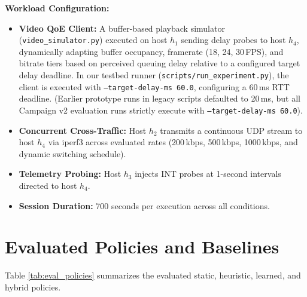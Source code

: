 \documentclass[12pt,a4paper,oneside]{report}
\begin{document}
\textbf{Workload Configuration:}
\begin{itemize}
  \item \textbf{Video QoE Client:} A buffer-based playback simulator (\texttt{video\_simulator.py}) executed on host $h_1$ sending delay probes to host $h_4$, dynamically adapting buffer occupancy, framerate (18, 24, 30\,FPS), and bitrate tiers based on perceived queuing delay relative to a configured target delay deadline. In our testbed runner (\texttt{scripts/run\_experiment.py}), the client is executed with \texttt{--target-delay-ms 60.0}, configuring a 60\,ms RTT deadline. (Earlier prototype runs in legacy scripts defaulted to 20\,ms, but all Campaign v2 evaluation runs strictly execute with \texttt{--target-delay-ms 60.0}).
  \item \textbf{Concurrent Cross-Traffic:} Host $h_2$ transmits a continuous UDP stream to host $h_4$ via iperf3 across evaluated rates (200\,kbps, 500\,kbps, 1000\,kbps, and dynamic switching schedule).
  \item \textbf{Telemetry Probing:} Host $h_3$ injects INT probes at 1-second intervals directed to host $h_4$.
  \item \textbf{Session Duration:} 700 seconds per execution across all conditions.
\end{itemize}

\section{Evaluated Policies and Baselines}
Table \ref{tab:eval_policies} summarizes the evaluated static, heuristic, learned, and hybrid policies.
\end{document}
